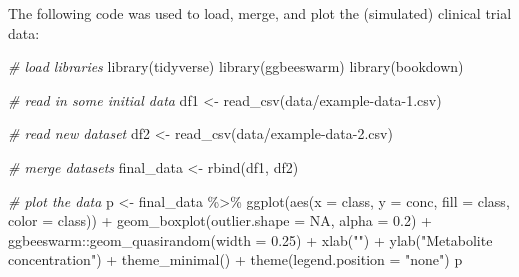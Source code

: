 \documentclass[smallextended]{svjour3}       %
\newenvironment{Shaded}{\begin{snugshade}}{\end{snugshade}}
\newcommand{\AttributeTok}[1]{\textcolor[rgb]{0.77,0.63,0.00}{#1}}
\newcommand{\CommentTok}[1]{\textcolor[rgb]{0.56,0.35,0.01}{\textit{#1}}}
\newcommand{\ConstantTok}[1]{\textcolor[rgb]{0.00,0.00,0.00}{#1}}
\newcommand{\FloatTok}[1]{\textcolor[rgb]{0.00,0.00,0.81}{#1}}
\newcommand{\FunctionTok}[1]{\textcolor[rgb]{0.00,0.00,0.00}{#1}}
\newcommand{\NormalTok}[1]{#1}
\newcommand{\OtherTok}[1]{\textcolor[rgb]{0.56,0.35,0.01}{#1}}
\newcommand{\SpecialCharTok}[1]{\textcolor[rgb]{0.00,0.00,0.00}{#1}}
\newcommand{\StringTok}[1]{\textcolor[rgb]{0.31,0.60,0.02}{#1}}
\begin{document}
The following code was used to load, merge, and plot the (simulated) clinical trial data:

\begin{Shaded}
\begin{Highlighting}[]
\CommentTok{\# load libraries}
\FunctionTok{library}\NormalTok{(tidyverse)}
\FunctionTok{library}\NormalTok{(ggbeeswarm)}
\FunctionTok{library}\NormalTok{(bookdown)}
\end{Highlighting}
\end{Shaded}

\begin{Shaded}
\begin{Highlighting}[]
\CommentTok{\# read in some initial data}
\NormalTok{df1 }\OtherTok{\textless{}{-}} \FunctionTok{read\_csv}\NormalTok{(}\StringTok{\textquotesingle{}data/example{-}data{-}1.csv\textquotesingle{}}\NormalTok{)}
\end{Highlighting}
\end{Shaded}

\begin{Shaded}
\begin{Highlighting}[]
\CommentTok{\# read new dataset}
\NormalTok{df2 }\OtherTok{\textless{}{-}} \FunctionTok{read\_csv}\NormalTok{(}\StringTok{\textquotesingle{}data/example{-}data{-}2.csv\textquotesingle{}}\NormalTok{)}
\end{Highlighting}
\end{Shaded}

\begin{Shaded}
\begin{Highlighting}[]
\CommentTok{\# merge datasets}
\NormalTok{final\_data }\OtherTok{\textless{}{-}} \FunctionTok{rbind}\NormalTok{(df1, df2)}
\end{Highlighting}
\end{Shaded}

\begin{Shaded}
\begin{Highlighting}[]
\CommentTok{\# plot the data}
\NormalTok{p }\OtherTok{\textless{}{-}}\NormalTok{ final\_data }\SpecialCharTok{\%\textgreater{}\%} 
  \FunctionTok{ggplot}\NormalTok{(}\FunctionTok{aes}\NormalTok{(}\AttributeTok{x =}\NormalTok{ class, }\AttributeTok{y =}\NormalTok{ conc, }\AttributeTok{fill =}\NormalTok{ class, }\AttributeTok{color =}\NormalTok{ class)) }\SpecialCharTok{+}
  \FunctionTok{geom\_boxplot}\NormalTok{(}\AttributeTok{outlier.shape =} \ConstantTok{NA}\NormalTok{, }\AttributeTok{alpha =} \FloatTok{0.2}\NormalTok{) }\SpecialCharTok{+}
\NormalTok{  ggbeeswarm}\SpecialCharTok{::}\FunctionTok{geom\_quasirandom}\NormalTok{(}\AttributeTok{width =} \FloatTok{0.25}\NormalTok{) }\SpecialCharTok{+} 
  \FunctionTok{xlab}\NormalTok{(}\StringTok{""}\NormalTok{) }\SpecialCharTok{+}
  \FunctionTok{ylab}\NormalTok{(}\StringTok{"Metabolite concentration"}\NormalTok{) }\SpecialCharTok{+} 
  \FunctionTok{theme\_minimal}\NormalTok{() }\SpecialCharTok{+}
  \FunctionTok{theme}\NormalTok{(}\AttributeTok{legend.position =} \StringTok{"none"}\NormalTok{)}
\NormalTok{p}
\end{Highlighting}
\end{Shaded}
\end{document}

